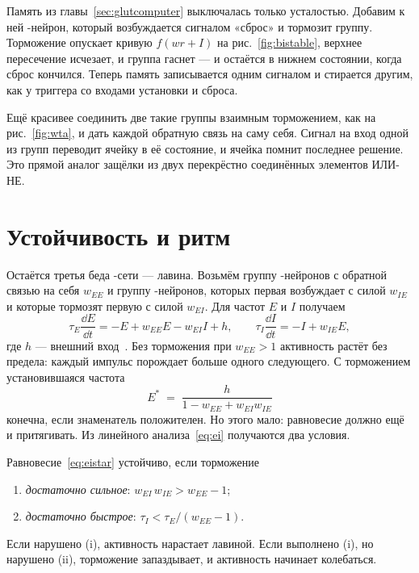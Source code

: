 Память из главы~\ref{sec:glutcomputer} выключалась только усталостью. Добавим к ней -нейрон, который возбуждается сигналом «сброс» и тормозит группу. Торможение опускает кривую $f(wr+I)$ на рис.~\ref{fig:bistable}, верхнее пересечение исчезает, и группа гаснет --- и остаётся в нижнем состоянии, когда сброс кончился. Теперь память записывается одним сигналом и стирается другим, как у триггера со входами установки и сброса.

Ещё красивее соединить две такие группы взаимным торможением, как на рис.~\ref{fig:wta}, и дать каждой обратную связь на саму себя. Сигнал на вход одной из групп переводит ячейку в её состояние, и ячейка помнит последнее решение. Это прямой аналог защёлки из двух перекрёстно соединённых элементов ИЛИ-НЕ.

\section{Устойчивость и ритм}

Остаётся третья беда -сети --- лавина. Возьмём группу -нейронов с обратной связью на себя $w_{EE}$ и группу -нейронов, которых первая возбуждает с силой $w_{IE}$ и которые тормозят первую с силой $w_{EI}$. Для частот $E$ и $I$ получаем
\begin{equation}
\tau_E\frac{\dd E}{\dd t} = -E + w_{EE}E - w_{EI}I + h, \qquad
\tau_I\frac{\dd I}{\dd t} = -I + w_{IE}E ,
\label{eq:ei}
\end{equation}
где $h$ --- внешний вход~\cite{WilsonCowan1972}. Без торможения при $w_{EE}>1$ активность растёт без предела: каждый импульс порождает больше одного следующего. С торможением установившаяся частота
\begin{equation}
E^* \;=\; \frac{h}{1-w_{EE}+w_{EI}w_{IE}}
\label{eq:eistar}
\end{equation}
конечна, если знаменатель положителен. Но этого мало: равновесие должно ещё и притягивать. Из линейного анализа~\eqref{eq:ei} получаются два условия.

\begin{keyblock}
\begin{proposition}
\label{prop:ei}
Равновесие~\eqref{eq:eistar} устойчиво, если торможение
\begin{enumerate}
\item[(i)] \emph{достаточно сильное}: $w_{EI}\,w_{IE} > w_{EE}-1$;
\item[(ii)] \emph{достаточно быстрое}: $\tau_I < \tau_E/(w_{EE}-1)$.
\end{enumerate}
Если нарушено (i), активность нарастает лавиной. Если выполнено (i), но нарушено (ii), торможение запаздывает, и активность начинает колебаться.
\end{proposition}
\end{keyblock}

